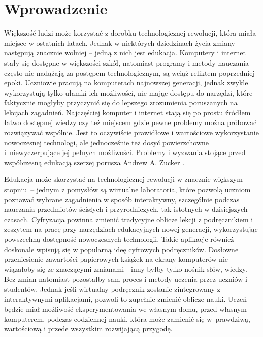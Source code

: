 \chapter{Wprowadzenie}
\label{cha:wprowadzenie}

Większość ludzi może korzystać z dorobku technologicznej rewolucji, która
miała miejsce w ostatnich latach. Jednak w niektórych dziedzinach życia zmiany
następują znacznie wolniej -- jedną z nich jest edukacja. Komputery i internet
stały się dostępne w większości szkół, natomiast programy i metody nauczania
często nie nadążają za postępem technologicznym, są wciąż reliktem poprzedniej
epoki. Uczniowie pracują na komputerach najnowszej generacji, jednak zwykle
wykorzystują tylko ułamki ich możliwości, nie mając dostępu do narzędzi, które
faktycznie mogłyby przyczynić się do lepszego zrozumienia poruszanych na
lekcjach zagadnień. Najczęściej komputer i internet stają się po prostu
źródłem łatwo dostępnej wiedzy czy też miejscem gdzie pewne problemy można
próbować rozwiązywać wspólnie. Jest to oczywiście prawidłowe i wartościowe
wykorzystanie nowoczesnej technologi, ale jednocześnie też dosyć powierzchowne
i~niewyczerpujące jej pełnych możliwości. Problemy i wyzwania stojące przed
współczesną edukacją szerzej porusza Andrew A. Zucker \cite{Zuc2009}.

Edukacja może skorzystać na technologicznej rewolucji w znacznie większym
stopniu~-- jednym z pomysłów są wirtualne laboratoria, które pozwolą uczniom
poznawać wybrane zagadnienia w sposób interaktywny, szczególnie podczas
nauczania przedmiotów ścisłych i przyrodniczych, tak istotnych w dzisiejszych
czasach. Cyfryzacja powinna zmienić tradycyjne oblicze lekcji z podręcznikiem
i zeszytem na pracę przy narzędziach edukacyjnych nowej generacji,
wykorzystując powszechną dostępność nowoczesnych technologii. Takie aplikacje
również doskonale wpisują się w popularną ideę cyfrowych podręczników.
Dosłowne przeniesienie zawartości papierowych książek na ekrany komputerów nie
wiązałoby się ze znaczącymi zmianami - inny byłby tylko nośnik słów, wiedzy.
Bez zmian natomiast pozostałby sam proces i metody uczenia przez uczniów i
studentów. Jednak jeśli wirtualny podręcznik zostanie zintegrowany z
interaktywnymi aplikacjami, pozwoli to zupełnie zmienić oblicze nauki. Uczeń
będzie miał możliwość eksperymentowania we własnym domu, przed własnym
komputerem, podczas codziennej nauki, która może zamienić się w~prawdziwą,
wartościową i przede wszystkim rozwijającą przygodę.

